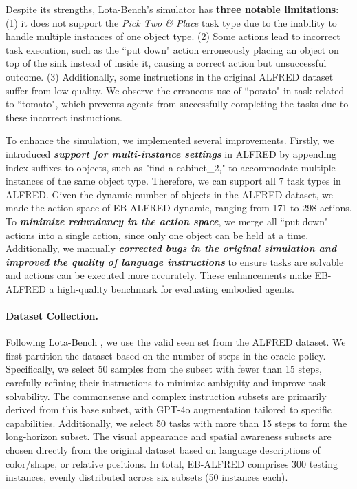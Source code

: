 Despite its strengths, Lota-Bench's simulator has \textbf{three notable limitations}: (1) it does not support the \textit{Pick Two \& Place} task type due to the inability to handle multiple instances of one object type. (2) Some actions lead to incorrect task execution, such as the ``put down" action erroneously placing an object on top of the sink instead of inside it, causing a correct action but unsuccessful outcome. (3) Additionally, some instructions in the original ALFRED dataset suffer from low quality. We observe the erroneous use of ``potato" in task related to ``tomato", which prevents agents from successfully completing the tasks due to these incorrect instructions.

To enhance the simulation, we implemented several improvements. Firstly, we introduced \textit{\textbf{support for multi-instance settings}} in ALFRED by appending index suffixes to objects, such as "find a cabinet\_2," to accommodate multiple instances of the same object type. Therefore, we can support all 7 task types in ALFRED. Given the dynamic number of objects in the ALFRED dataset, we made the action space of EB-ALFRED dynamic, ranging from 171 to 298 actions. To \textit{\textbf{minimize redundancy in the action space}}, we merge all ``put down" actions into a single action, since only one object can be held at a time. Additionally, we manually \textit{\textbf{corrected bugs in the original simulation and improved the quality of language instructions}} to ensure tasks are solvable and actions can be executed more accurately. These enhancements make EB-ALFRED a high-quality benchmark for evaluating embodied agents.

\paragraph{Dataset Collection.} Following Lota-Bench \cite{choi2024lota}, we use the valid seen set from the ALFRED dataset. We first partition the dataset based on the number of steps in the oracle policy. Specifically, we select 50 samples from the subset with fewer than 15 steps, carefully refining their instructions to minimize ambiguity and improve task solvability. The commonsense and complex instruction subsets are primarily derived from this base subset, with GPT-4o augmentation tailored to specific capabilities. Additionally, we select 50 tasks with more than 15 steps to form the long-horizon subset. The visual appearance and spatial awareness subsets are chosen directly from the original dataset based on language descriptions of color/shape, or relative positions. In total, EB-ALFRED comprises 300 testing instances, evenly distributed across six subsets (50 instances each).





